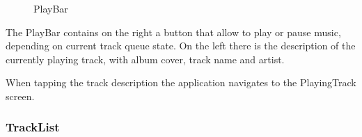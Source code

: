 \documentclass{article}
\begin{document}
\begin{figure}[H]
	\noindent
	\caption{PlayBar} 
\end{figure}

The PlayBar contains on the right a button that allow to play or pause music,
depending on current track queue state. On the left there is the description of
the currently playing track, with album cover, track name and artist.

When tapping the track description the application navigates to the PlayingTrack
screen.

\subsubsection{TrackList}
\end{document}
